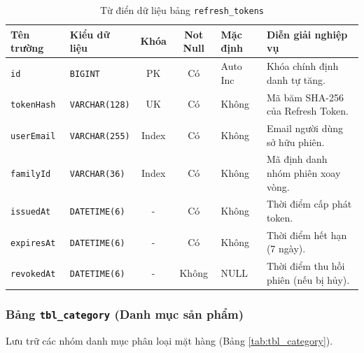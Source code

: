 \begin{table}[htbp]
\centering
\caption{Từ điển dữ liệu bảng \texttt{refresh\_tokens}}
\label{tab:refresh_tokens}
\vspace{2mm}
\begin{tabularx}{\textwidth}{|p{2.5cm}|p{2.8cm}|c|c|p{1.8cm}|X|}
\hline
\textbf{Tên trường} & \textbf{Kiểu dữ liệu} & \textbf{Khóa} & \textbf{Not Null} & \textbf{Mặc định} & \textbf{Diễn giải nghiệp vụ} \\ \hline
\texttt{id} & \texttt{BIGINT} & PK & Có & Auto Inc & Khóa chính định danh tự tăng. \\ \hline
\texttt{tokenHash} & \texttt{VARCHAR(128)} & UK & Có & Không & Mã băm SHA-256 của Refresh Token. \\ \hline
\texttt{userEmail} & \texttt{VARCHAR(255)} & Index & Có & Không & Email người dùng sở hữu phiên. \\ \hline
\texttt{familyId} & \texttt{VARCHAR(36)} & Index & Có & Không & Mã định danh nhóm phiên xoay vòng. \\ \hline
\texttt{issuedAt} & \texttt{DATETIME(6)} & - & Có & Không & Thời điểm cấp phát token. \\ \hline
\texttt{expiresAt} & \texttt{DATETIME(6)} & - & Có & Không & Thời điểm hết hạn (7 ngày). \\ \hline
\texttt{revokedAt} & \texttt{DATETIME(6)} & - & Không & NULL & Thời điểm thu hồi phiên (nếu bị hủy). \\ \hline
\end{tabularx}
\end{table}

\subsubsection{Bảng \texttt{tbl\_category} (Danh mục sản phẩm)}
Lưu trữ các nhóm danh mục phân loại mặt hàng (Bảng \ref{tab:tbl_category}).

